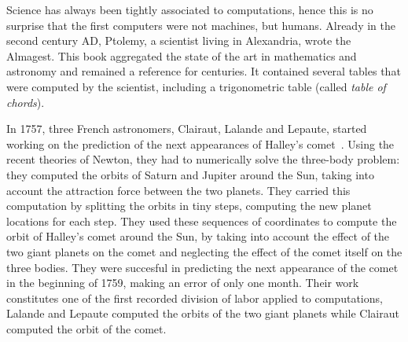 \label{chapter:introduction}



\label{chapter:context}


    \label{sec:first_computers}

        Science has always been tightly associated to computations, hence this is no surprise that the first computers
        were not machines, but humans. Already in the second century AD, Ptolemy, a scientist living in Alexandria,
        wrote the Almagest. This book aggregated the state of the art in mathematics and astronomy and remained a
        reference for centuries. It contained several tables that were computed by the scientist, including a
        trigonometric table (called \emph{table of chords}).

        In 1757, three French astronomers, Clairaut, Lalande and Lepaute, started working on the prediction of the next
        appearances of Halley's comet~\cite[Chapter~1]{human_computers}. Using the recent theories of Newton, they had
        to numerically solve the three-body problem: they computed the orbits of Saturn and Jupiter around the Sun,
        taking into account the attraction force between the two planets. They carried this computation by splitting the
        orbits in tiny steps, computing the new planet locations for each step. They used these sequences of coordinates
        to compute the orbit of Halley's comet around the Sun, by taking into account the effect of the two giant
        planets on the comet and neglecting the effect of the comet itself on the three bodies. They were succesful in
        predicting the next appearance of the comet in the beginning of 1759, making an error of only one month. Their
        work constitutes one of the first recorded division of labor applied to computations, Lalande and Lepaute
        computed the orbits of the two giant planets while Clairaut computed the orbit of the comet.

